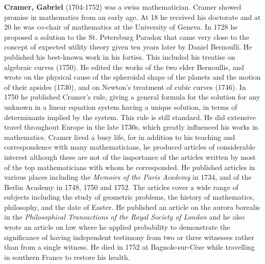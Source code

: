 \textbf{Cramer, Gabriel} (1704-1752) was a swiss mathematician. Cramer showed promise in mathematics from an early age. At 18 he received his doctorate and at 20 he was co-chair of mathematics at the University of Geneva. In 1728 he proposed a solution to the St. Petersburg Paradox that came very close to the concept of expected utility theory given ten years later by Daniel Bernoulli. He published his best-known work in his forties. This included his treatise on algebraic curves (1750). He edited the works of the two elder Bernoullis, and wrote on the physical cause of the spheroidal shape of the planets and the motion of their apsides (1730), and on Newton's treatment of cubic curves (1746). In 1750 he published Cramer's rule, giving a general formula for the solution for any unknown in a linear equation system having a unique solution, in terms of determinants implied by the system. This rule is still standard. He did extensive travel throughout Europe in the late 1730s, which greatly influenced his works in mathematics. Cramer lived a busy life, for in addition to his teaching and correspondence with many mathematicians, he produced articles of considerable interest although these are not of the importance of the articles written by most of the top mathematicians with whom he corresponded. He published articles in various places including the \textit{Memoirs of the Paris Academy} in 1734, and of the Berlin Academy in 1748, 1750 and 1752. The articles cover a wide range of subjects including the study of geometric problems, the history of mathematics, philosophy, and the date of Easter. He published an article on the aurora borealis in the \textit{Philosophical Transactions of the Royal Society of London} and he also wrote an article on law where he applied probability to demonstrate the significance of having independent testimony from two or three witnesses rather than from a single witness. He died in 1752 at Bagnols-sur-Cèze while travelling in southern France to restore his health. 

